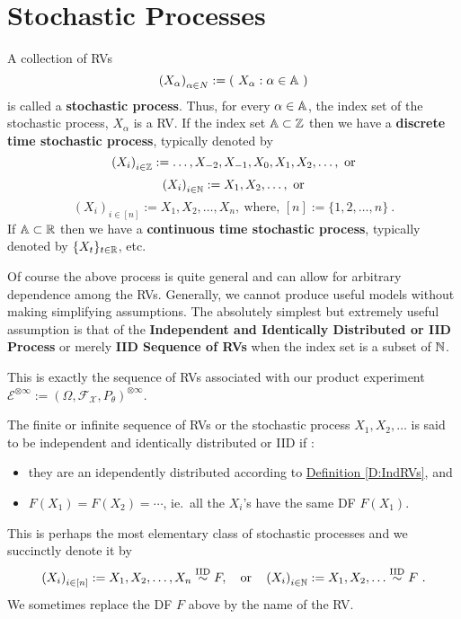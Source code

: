 {
\section{Stochastic Processes}\label{S:StochProc}

\begin{definition}
A collection of RVs  \[
\left(X_{\alpha} \right)_{\alpha \in N} := \left( \  X_{\alpha} : \alpha \in \mathbb{A} \  \right)
\]
is called a {\bf stochastic process}.  Thus, for every $\alpha \in  \mathbb{A}$, the index set of the stochastic process, $X_{\alpha}$ is a RV.  If the index set $ \mathbb{A}  \subset \mathbb{Z}$ then we have  a {\bf discrete time stochastic process}, typically denoted by 
\[
\left(X_i\right)_{i \in \mathbb{Z}} := \ldots, X_{-2},X_{-1},X_0, X_1,X_2,\ldots , \  \text{or}
\]
\[
\left( X_i \right)_{i \in \mathbb{N}} := X_1,X_2,\ldots , \  \text{or}
\]
\[
\left( X_i \right)_{i \in [n]} := X_1,X_2,\ldots , X_n , \ \text{where, } [n]:= \{1,2,\ldots,n\} \ .
\]
If $\mathbb{A} \subset \mathbb{R}$ then we have a {\bf continuous time stochastic process}, typically denoted by $\{X_t\}_{t \in \mathbb{R}}$, etc.  
\end{definition}

Of course the above process is quite general and can allow for arbitrary dependence among the RVs.  
Generally, we cannot produce useful models without making simplifying assumptions. 
The absolutely simplest but extremely useful assumption is that of the {\bf Independent and Identically Distributed or IID Process} or merely {\bf IID Sequence of RVs} when the index set is a subset of $\mathbb{N}$. 

This is exactly the sequence of RVs associated with our product experiment $\mathcal{E}^{\otimes \infty} := (\Omega, \mathcal{F}_{\mathcal{X}}, P_{\theta})^{\otimes \infty}$.
    
\begin{definition}
The finite or infinite sequence of RVs or the stochastic process $X_1, X_2,\ldots$ is said to be independent and identically distributed or IID if :
\begin{itemize}
\item they are an idependently distributed according to \hyperref[D:IndRVs]{Definition \ref*{D:IndRVs}}, and
\item $F(X_1) = F(X_2) = \cdots $, ie.~all the $X_i$'s have the same DF $F(X_1)$.
\end{itemize}
This is perhaps the most elementary class of stochastic processes and we succinctly denote it by
\[
\left(X_i\right)_{i \in [n]} := X_1, X_2,\ldots, X_n \overset{{\rm IID}}{\sim} F, \quad \text{or} \quad \left(X_i\right)_{i \in \mathbb{N}} := X_1, X_2,\ldots  \overset{{\rm IID}}{\sim} F \ .
\]
We sometimes replace the DF $F$ above by the name of the RV.
 \end{definition}
 
}
